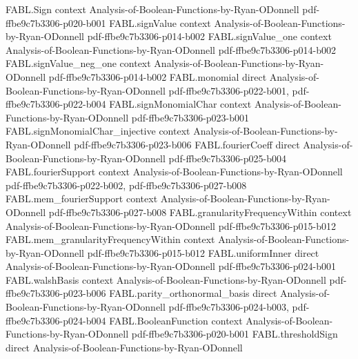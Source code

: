 \begin{theorem}
\label{FABL.eval_middleLayerBinomialPolynomial}
\leanok
{}
\proofstep
  {FABL.Sign}
  {context}
  {Analysis-of-Boolean-Functions-by-Ryan-ODonnell}
  {pdf-ffbe9c7b3306-p020-b001}
\proofstep
  {FABL.signValue}
  {context}
  {Analysis-of-Boolean-Functions-by-Ryan-ODonnell}
  {pdf-ffbe9c7b3306-p014-b002}
\proofstep
  {FABL.signValue_one}
  {context}
  {Analysis-of-Boolean-Functions-by-Ryan-ODonnell}
  {pdf-ffbe9c7b3306-p014-b002}
\proofstep
  {FABL.signValue_neg_one}
  {context}
  {Analysis-of-Boolean-Functions-by-Ryan-ODonnell}
  {pdf-ffbe9c7b3306-p014-b002}
\proofstep
  {FABL.monomial}
  {direct}
  {Analysis-of-Boolean-Functions-by-Ryan-ODonnell}
  {pdf-ffbe9c7b3306-p022-b001,
    pdf-ffbe9c7b3306-p022-b004}
\proofstep
  {FABL.signMonomialChar}
  {context}
  {Analysis-of-Boolean-Functions-by-Ryan-ODonnell}
  {pdf-ffbe9c7b3306-p023-b001}
\proofstep
  {FABL.signMonomialChar_injective}
  {context}
  {Analysis-of-Boolean-Functions-by-Ryan-ODonnell}
  {pdf-ffbe9c7b3306-p023-b006}
\proofstep
  {FABL.fourierCoeff}
  {direct}
  {Analysis-of-Boolean-Functions-by-Ryan-ODonnell}
  {pdf-ffbe9c7b3306-p025-b004}
\proofstep
  {FABL.fourierSupport}
  {context}
  {Analysis-of-Boolean-Functions-by-Ryan-ODonnell}
  {pdf-ffbe9c7b3306-p022-b002,
    pdf-ffbe9c7b3306-p027-b008}
\proofstep
  {FABL.mem_fourierSupport}
  {context}
  {Analysis-of-Boolean-Functions-by-Ryan-ODonnell}
  {pdf-ffbe9c7b3306-p027-b008}
\proofstep
  {FABL.granularityFrequencyWithin}
  {context}
  {Analysis-of-Boolean-Functions-by-Ryan-ODonnell}
  {pdf-ffbe9c7b3306-p015-b012}
\proofstep
  {FABL.mem_granularityFrequencyWithin}
  {context}
  {Analysis-of-Boolean-Functions-by-Ryan-ODonnell}
  {pdf-ffbe9c7b3306-p015-b012}
\proofstep
  {FABL.uniformInner}
  {direct}
  {Analysis-of-Boolean-Functions-by-Ryan-ODonnell}
  {pdf-ffbe9c7b3306-p024-b001}
\proofstep
  {FABL.walshBasis}
  {context}
  {Analysis-of-Boolean-Functions-by-Ryan-ODonnell}
  {pdf-ffbe9c7b3306-p023-b006}
\proofstep
  {FABL.parity_orthonormal_basis}
  {direct}
  {Analysis-of-Boolean-Functions-by-Ryan-ODonnell}
  {pdf-ffbe9c7b3306-p024-b003,
    pdf-ffbe9c7b3306-p024-b004}
\proofstep
  {FABL.BooleanFunction}
  {context}
  {Analysis-of-Boolean-Functions-by-Ryan-ODonnell}
  {pdf-ffbe9c7b3306-p020-b001}
\proofstep
  {FABL.thresholdSign}
  {direct}
  {Analysis-of-Boolean-Functions-by-Ryan-ODonnell}

\end{theorem}
